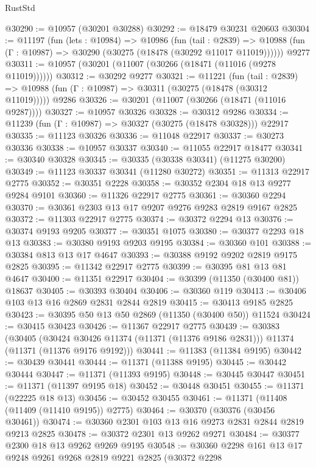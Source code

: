 \begin{lexlean}{RustStd}
\begin{coremodule}
@30290 := @10957 (@30201 @30288)
@30292 := @18479 @30231 @20603
@30304 := @11197
    (fun (lets : @10984) =>
    @10986
      (fun (tail : @2839) =>
      @10988 (fun (Γ : @10987) => @30290 (@30275 (@18478 (@30292 @11017 @11019))))))
    @9277
@30311 := @10957 (@30201 (@11007 (@30266 (@18471 (@11016 (@9278 @11019))))))
@30312 := @30292 @9277
@30321 := @11221
    (fun (tail : @2839) => @10988 (fun (Γ : @10987) => @30311 (@30275 (@18478 (@30312 @11019)))))
    @9286
@30326 := @30201 (@11007 (@30266 (@18471 (@11016 @9287))))
@30327 := @10957 @30326
@30328 := @30312 @9286
@30334 := @11239 (fun (Γ : @10987) => @30327 (@30275 (@18478 @30328))) @22917
@30335 := @11123 @30326
@30336 := @11048 @22917
@30337 := @30273 @30336
@30338 := @10957 @30337
@30340 := @11055 @22917 @18477
@30341 := @30340 @30328
@30345 := @30335 (@30338 @30341) (@11275 @30200)
@30349 := @11123 @30337 @30341 (@11280 @30272)
@30351 := @11313 @22917 @2775
@30352 := @30351 @2228
@30358 := @30352 @2304 @18 @13 @9277 @9284 @9101
@30360 := @11326 @22917 @2775
@30361 := @30360 @2294
@30370 := @30361 @2303 @13 @17 @9207 @9276 @9283 @2819 @9167 @2825
@30372 := @11303 @22917 @2775
@30374 := @30372 @2294 @13
@30376 := @30374 @9193 @9205
@30377 := @30351 @1075
@30380 := @30377 @2293 @18 @13
@30383 := @30380 @9193 @9203 @9195
@30384 := @30360 @101
@30388 := @30384 @813 @13 @17 @4647
@30393 := @30388 @9192 @9202 @2819 @9175 @2825
@30395 := @11342 @22917 @2775
@30399 := @30395 @81 @13 @81 @4647
@30400 := @11351 @22917
@30404 := @30399 (@11350 (@30400 @81)) @18637
@30405 := @30393 @30404
@30406 := @30360 @119
@30413 := @30406 @103 @13 @16 @2869 @2831 @2844 @2819
@30415 := @30413 @9185 @2825
@30423 := @30395 @50 @13 @50 @2869 (@11350 (@30400 @50)) @11524
@30424 := @30415 @30423
@30426 := @11367 @22917 @2775
@30439 := @30383
    (@30405
      (@30424 @30426 @11374 (@11371 (@11376 @9186 @2831)))
      @11374
      (@11371 (@11376 @9176 @9192)))
@30441 := @11383 (@11384 @9195)
@30442 := @30439 @30441
@30444 := @11371 (@11388 @9195)
@30445 := @30442 @30444
@30447 := @11371 (@11393 @9195)
@30448 := @30445 @30447
@30451 := @11371 (@11397 @9195 @18)
@30452 := @30448 @30451
@30455 := @11371 (@22225 @18 @13)
@30456 := @30452 @30455
@30461 := @11371 (@11408 (@11409 (@11410 @9195)) @2775)
@30464 := @30370 (@30376 (@30456 @30461))
@30474 := @30360 @2301 @103 @13 @16 @9273 @2831 @2844 @2819 @9213 @2825
@30478 := @30372 @2301 @13 @9262 @9271
@30484 := @30377 @2300 @18 @13 @9262 @9269 @9195
@30548 := @30360
    @2298
    @161
    @13
    @17
    @9248
    @9261
    @9268
    @2819
    @9221
    @2825
    (@30372
      @2298

\end{coremodule}
\end{lexlean}
